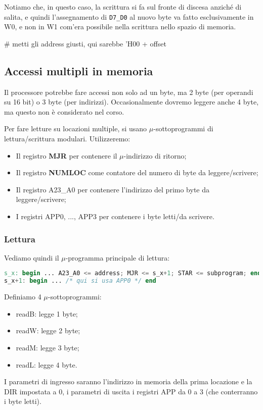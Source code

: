 \documentclass[a4paper,11pt]{article}
\begin{document}
Notiamo che, in questo caso, la scrittura si fa sul fronte di discesa anziché di salita, e quindi l'assegnamento di \lstinline|D7_D0| al nuovo byte va fatto esclusivamente in W0, e non in W1 com'era possibile nella scrittura nello spazio di memoria. 

# metti gli address giusti, qui sarebbe 'H00 + offset

\subsection{Accessi multipli in memoria}
Il processore potrebbe fare accessi non solo ad un byte, ma 2 byte (per operandi su 16 bit) o 3 byte (per indirizzi).
Occasionalmente dovremo leggere anche 4 byte, ma questo non è considerato nel corso.

Per fare letture su locazioni multiple, si usano $\mu$-sottoprogrammi di lettura/scrittura modulari.
Utilizzeremo:
\begin{itemize}
	\item Il registro \textbf{MJR} per contenere il $\mu$-indirizzo di ritorno;
	\item Il registro \textbf{NUMLOC} come contatore del numero di byte da leggere/scrivere;
	\item Il registro A23\_A0 per contenere l'indirizzo del primo byte da leggere/scrivere;
	\item I registri APP0, ..., APP3 per contenere i byte letti/da scrivere.
\end{itemize}

\subsubsection{Lettura}
Vediamo quindi il $\mu$-programma principale di lettura:
\begin{lstlisting}[language=verilog, style=codestyle]	
s_x: begin ... A23_A0 <= address; MJR <= s_x+1; STAR <= subprogram; end
s_x+1: begin ... /* qui si usa APP0 */ end
\end{lstlisting}

Definiamo 4 $\mu$-sottoprogrammi:
\begin{itemize}
	\item readB: legge 1 byte;
	\item readW: legge 2 byte;
	\item readM: legge 3 byte;
	\item readL: legge 4 byte.
\end{itemize}

I parametri di ingresso saranno l'indirizzo in memoria della prima locazione e la DIR impostata a 0, i parametri di uscita i registri APP da 0 a 3 (che conterranno i byte letti).
\end{document}
